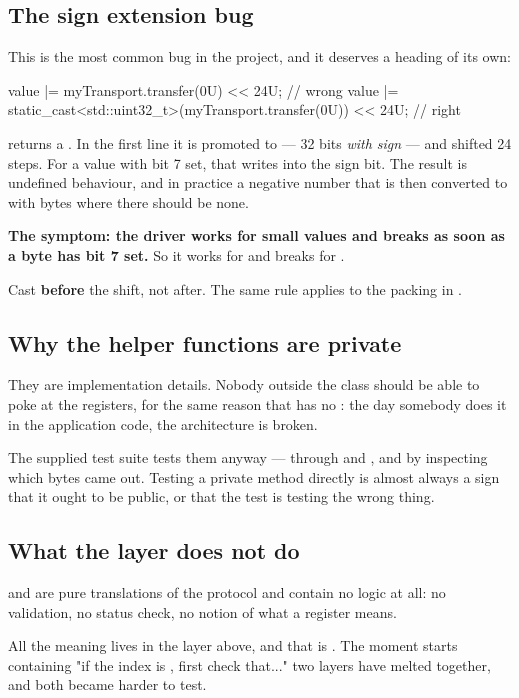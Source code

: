 \subsection{The sign extension bug}

This is the most common bug in the project, and it deserves a heading of its own:

\begin{cppcode}
value |= myTransport.transfer(0U) << 24U;                             // wrong
value |= static_cast<std::uint32_t>(myTransport.transfer(0U)) << 24U; // right
\end{cppcode}

 returns a . In the first line it is promoted to  ---
32 bits \emph{with sign} --- and shifted 24 steps. For a value with bit 7 set, that writes into the
sign bit. The result is undefined behaviour, and in practice a negative number that is then
converted to  with  bytes where there should be none.

\textbf{The symptom: the driver works for small values and breaks as soon as a byte has bit 7
set.} So it works for  and breaks for .

\begin{aside}
\note[Rule] Cast \textbf{before} the shift, not after. The same rule applies to the packing in
.
\end{aside}

\subsection{Why the helper functions are private}

They are implementation details. Nobody outside the class should be able to poke at the registers,
for the same reason that  has no : the day somebody
does it in the application code, the architecture is broken.

The supplied test suite tests them anyway --- through  and , and by
inspecting which bytes came out. Testing a private method directly is almost always a sign that it
ought to be public, or that the test is testing the wrong thing.

\subsection{What the layer does not do}

 and  are pure translations of the protocol and contain no logic
at all: no validation, no status check, no notion of what a register means.

All the meaning lives in the layer above, and that is . The moment
 starts containing "if the index is , first check that..." two
layers have melted together, and both became harder to test.
